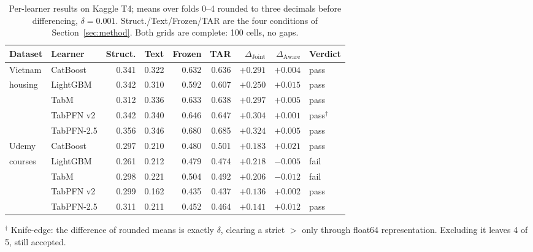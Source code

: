\documentclass[10pt,letterpaper]{article}
\newcommand{\dj}{\Delta_{\mathrm{Joint}}}
\newcommand{\da}{\Delta_{\mathrm{Aware}}}
\begin{document}
\begin{table}[t]
\centering
\caption{Per-learner results on Kaggle T4; means over folds 0--4 rounded to three decimals
before differencing, $\delta = 0.001$. Struct./Text/Frozen/TAR are the four conditions of
Section~\ref{sec:method}. Both grids are complete: 100 cells, no gaps.}
\label{tab:results}
\small
\begin{tabular}{llrrrrrrl}
\toprule
Dataset & Learner & Struct. & Text & Frozen & TAR & $\dj$ & $\da$ & Verdict \\
\midrule
Vietnam & CatBoost   & 0.341 & 0.322 & 0.632 & 0.636 & $+0.291$ & $+0.004$ & pass \\
housing & LightGBM   & 0.342 & 0.310 & 0.592 & 0.607 & $+0.250$ & $+0.015$ & pass \\
        & TabM       & 0.312 & 0.336 & 0.633 & 0.638 & $+0.297$ & $+0.005$ & pass \\
        & TabPFN v2  & 0.342 & 0.340 & 0.646 & 0.647 & $+0.304$ & $+0.001$ & pass$^{\dagger}$ \\
        & TabPFN-2.5 & 0.356 & 0.346 & 0.680 & 0.685 & $+0.324$ & $+0.005$ & pass \\
\midrule
Udemy   & CatBoost   & 0.297 & 0.210 & 0.480 & 0.501 & $+0.183$ & $+0.021$ & pass \\
courses & LightGBM   & 0.261 & 0.212 & 0.479 & 0.474 & $+0.218$ & $-0.005$ & fail \\
        & TabM       & 0.298 & 0.221 & 0.504 & 0.492 & $+0.206$ & $-0.012$ & fail \\
        & TabPFN v2  & 0.299 & 0.162 & 0.435 & 0.437 & $+0.136$ & $+0.002$ & pass \\
        & TabPFN-2.5 & 0.311 & 0.211 & 0.452 & 0.464 & $+0.141$ & $+0.012$ & pass \\
\bottomrule
\end{tabular}
\vspace{2pt}
\parbox{0.95\textwidth}{\footnotesize $^{\dagger}$ Knife-edge: the difference of rounded means
is exactly $\delta$, clearing a strict $>$ only through float64 representation. Excluding it
leaves 4 of 5, still accepted.}
\end{table}
\end{document}
